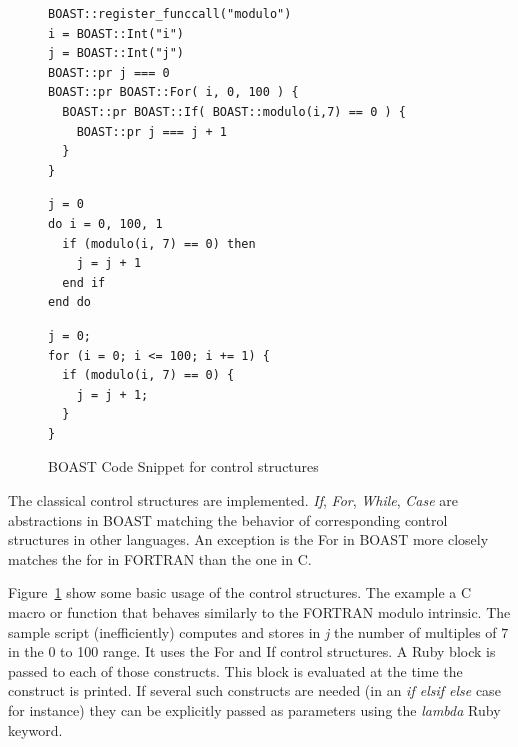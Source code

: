 \documentclass[review]{elsarticle}
\begin{document}
\begin{figure}
\begin{lstlisting}
BOAST::register_funccall("modulo")
i = BOAST::Int("i")
j = BOAST::Int("j")
BOAST::pr j === 0
BOAST::pr BOAST::For( i, 0, 100 ) {
  BOAST::pr BOAST::If( BOAST::modulo(i,7) == 0 ) {
    BOAST::pr j === j + 1
  }
}
\end{lstlisting}

\begin{minipage}[b]{0.47\linewidth}
\centering
{}

\begin{lstlisting}
j = 0
do i = 0, 100, 1
  if (modulo(i, 7) == 0) then
    j = j + 1
  end if
end do
\end{lstlisting}
\end{minipage}
\hspace{0.04\linewidth}
\begin{minipage}[b]{0.47\linewidth}
\centering
{}

\begin{lstlisting}
j = 0;
for (i = 0; i <= 100; i += 1) {
  if (modulo(i, 7) == 0) {
    j = j + 1;
  }
}
\end{lstlisting}
\end{minipage}
\caption{BOAST Code Snippet for control structures}
\label{fig:BOAST_control}
\end{figure}

The classical control structures are implemented. \emph{If}, \emph{For},
\emph{While}, \emph{Case} are abstractions in BOAST matching the behavior of
corresponding control structures in other languages. An exception is the For in
BOAST more closely matches the for in FORTRAN than the one in C.

Figure~\ref{fig:BOAST_control} show some basic usage of the control structures.
The example a C macro or function that behaves similarly to the FORTRAN modulo
intrinsic. The sample script (inefficiently) computes and stores in \emph{j} the
number of multiples of $7$ in the 0 to 100 range. It uses the For and If control
structures. A Ruby block is passed to each of those constructs. This block is
evaluated at the time the construct is printed. If several such constructs are
needed (in an \emph{if elsif else} case for instance) they can be explicitly
passed as parameters using the \emph{lambda} Ruby keyword.
\end{document}
